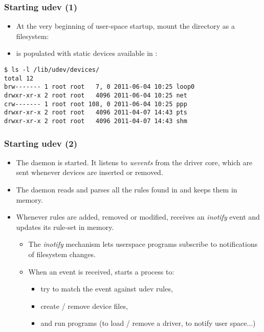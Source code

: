 \begin{frame}[fragile]
  \frametitle{Starting udev (1)}
  \begin{itemize}
  \item At the very beginning of user-space startup,
    mount the  directory as a  filesystem:\\
  \item {} is populated with static devices available in
    :
  \end{itemize}
  \begin{block}{}
\begin{verbatim}
$ ls -l /lib/udev/devices/
total 12
brw------- 1 root root   7, 0 2011-06-04 10:25 loop0
drwxr-xr-x 2 root root   4096 2011-06-04 10:25 net
crw------- 1 root root 108, 0 2011-06-04 10:25 ppp
drwxr-xr-x 2 root root   4096 2011-04-07 14:43 pts
drwxr-xr-x 2 root root   4096 2011-04-07 14:43 shm
\end{verbatim}
  \end{block}
\end{frame}

\begin{frame}
  \frametitle{Starting udev (2)}
  \begin{itemize}
  \item The  daemon is started.  It listens to {\em uevents}
    from the driver core, which are sent whenever devices are inserted
    or removed.
  \item The  daemon reads and parses all the rules found
    in  and keeps them in memory.
  \item Whenever rules are added, removed or modified, 
    receives an {\em inotify} event and updates its rule-set in memory.
    \begin{itemize}
    \item The {\em inotify} mechanism lets userspace programs
      subscribe to notifications of filesystem changes.
    \item When an event is received,  starts a process to:
      \begin{itemize}
      \item try to match the event against udev rules,
      \item create / remove device files,
      \item and run programs (to load / remove a driver, to notify user
        space...)
      \end{itemize}
    \end{itemize}
  \end{itemize}
\end{frame}


